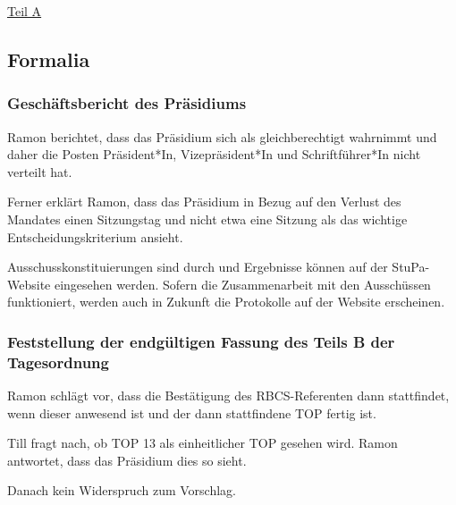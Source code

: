 \documentclass[ngerman,headheight=70pt]{scrartcl}
\begin{document}
    \newpage

    {\Large \underline{Teil A}}

    \subsection{Formalia}

    \subsubsection{Geschäftsbericht des Präsidiums}

    Ramon berichtet, dass das Präsidium sich als gleichberechtigt wahrnimmt und
    daher die Posten Präsident*In, Vizepräsident*In und Schriftführer*In nicht
    verteilt hat.

    Ferner erklärt Ramon, dass das Präsidium in Bezug auf den Verlust des Mandates
    einen Sitzungstag und nicht etwa eine Sitzung als das wichtige
    Entscheidungskriterium ansieht.

    Ausschusskonstituierungen sind durch und Ergebnisse können auf der StuPa-Website
    eingesehen werden. Sofern die Zusammenarbeit mit den Ausschüssen funktioniert,
    werden auch in Zukunft die Protokolle auf der Website erscheinen.

    \subsubsection{Feststellung der endgültigen Fassung des Teils B der Tagesordnung}

    Ramon schlägt vor, dass die Bestätigung des RBCS-Referenten dann stattfindet,
    wenn dieser anwesend ist und der dann stattfindene TOP fertig ist.

    Till fragt nach, ob TOP 13 als einheitlicher TOP gesehen wird. Ramon antwortet,
    dass das Präsidium dies so sieht.

    Danach kein Widerspruch zum Vorschlag.
\end{document}
